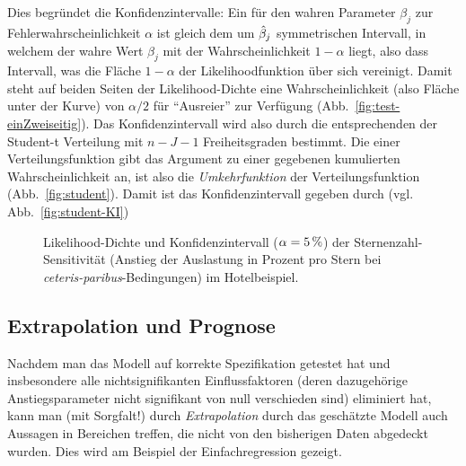 Dies begr\"undet die Konfidenzintervalle: Ein
 f\"ur den
wahren Parameter $\beta_j$ zur
Fehlerwahrscheinlichkeit $\alpha$ ist gleich dem um $\hat{\beta}_j$ symmetrischen
Intervall, in welchem der wahre Wert $\beta_j$  mit der
Wahrscheinlichkeit $1-\alpha$ liegt, also dass Intervall, was die
Fl\"ache $1-\alpha$ der Likelihoodfunktion \"uber sich vereinigt.
 Damit steht auf beiden Seiten der
Likelihood-Dichte eine Wahrscheinlichkeit (also Fl\"ache unter der
Kurve) von $\alpha/2$ f\"ur
``Ausrei\3er'' zur Verf\"ugung (Abb.~\ref{fig:test-einZweiseitig}). 
Das Konfidenzintervall wird also durch
die entsprechenden  der Student-t Verteilung mit
$n-J-1$ Freiheitsgraden bestimmt. Die  einer
Verteilungsfunktion gibt das Argument zu einer gegebenen kumulierten 
Wahrscheinlichkeit an, ist also die \emph{Umkehrfunktion} der
Verteilungsfunktion (Abb.~\ref{fig:student}). Damit ist das
Konfidenzintervall gegeben durch (vgl. Abb.~\ref{fig:student-KI})

\begin{figure}
\caption{\label{fig:KI-hotel}Likelihood-Dichte und Konfidenzintervall 
($\alpha=\unit[5]{\%}$) der
Sternenzahl-Sensitivit\"at (Anstieg der Auslastung in Prozent pro
Stern bei \emph{ceteris-paribus}-Bedingungen) im Hotelbeispiel.
}
\end{figure}


\subsection{\label{sec:prog}Extrapolation und Prognose}
%
Nachdem man das Modell auf korrekte Spezifikation getestet hat und
insbesondere alle nichtsignifikanten Einflussfaktoren (deren
dazugeh\"orige Anstiegsparameter nicht signifikant von null
verschieden sind) eliminiert hat, kann man (mit Sorgfalt!) durch \emph{Extrapolation}
durch das  gesch\"atzte Modell auch Aussagen in Bereichen treffen, die
nicht von den bisherigen Daten abgedeckt wurden. 
Dies wird am Beispiel der Einfachregression gezeigt. 


